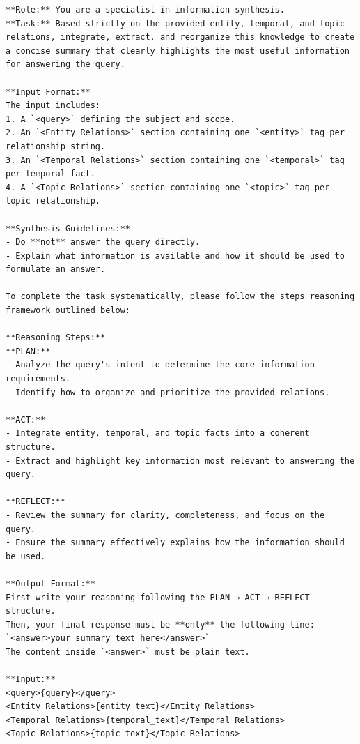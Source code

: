 \begin{center}
\begin{tcolorbox}[title={SUMMARY MODULE PROMPT (High)}]
\begin{Verbatim}[breaklines, breakanywhere,fontfamily=tt, fontseries=b, baselinestretch=0.95]
**Role:** You are a specialist in information synthesis.
**Task:** Based strictly on the provided entity, temporal, and topic relations, integrate, extract, and reorganize this knowledge to create a concise summary that clearly highlights the most useful information for answering the query.

**Input Format:**
The input includes:
1. A `<query>` defining the subject and scope.
2. An `<Entity Relations>` section containing one `<entity>` tag per relationship string.
3. An `<Temporal Relations>` section containing one `<temporal>` tag per temporal fact.
4. A `<Topic Relations>` section containing one `<topic>` tag per topic relationship.

**Synthesis Guidelines:**
- Do **not** answer the query directly.
- Explain what information is available and how it should be used to formulate an answer.

To complete the task systematically, please follow the steps reasoning framework outlined below:

**Reasoning Steps:**
**PLAN:**
- Analyze the query's intent to determine the core information requirements.
- Identify how to organize and prioritize the provided relations.

**ACT:**
- Integrate entity, temporal, and topic facts into a coherent structure.
- Extract and highlight key information most relevant to answering the query.

**REFLECT:**
- Review the summary for clarity, completeness, and focus on the query.
- Ensure the summary effectively explains how the information should be used.

**Output Format:**
First write your reasoning following the PLAN → ACT → REFLECT structure.
Then, your final response must be **only** the following line:
`<answer>your summary text here</answer>`
The content inside `<answer>` must be plain text.

**Input:**
<query>{query}</query>
<Entity Relations>{entity_text}</Entity Relations>
<Temporal Relations>{temporal_text}</Temporal Relations>
<Topic Relations>{topic_text}</Topic Relations>
\end{Verbatim}
\end{tcolorbox}
\end{center}

